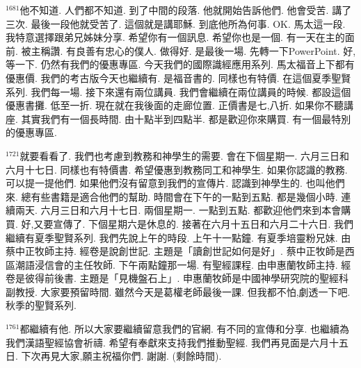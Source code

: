 \documentclass{book}
\begin{document}
$^{1681}$他不知道.
人們都不知道.
到了中間的段落.
他就開始告訴他們.
他會受苦.
講了三次.
最後一段他就受苦了.
這個就是講耶穌.
到底他所為何事.
OK.
馬太這一段.
我特意選擇跟弟兄姊妹分享.
希望你有一個訊息.
希望你也是一個.
有一天在主的面前.
被主稱讚.
有良善有忠心的僕人.
做得好.
是最後一場.
先轉一下PowerPoint.
好,等一下.
仍然有我們的優惠專區.
今天我們的國際識經應用系列.
馬太福音上下都有優惠價.
我們的考古版今天也繼續有.
是福音書的.
同樣也有特價.
在這個夏季聖賢系列.
我們每一場.
接下來還有兩位講員.
我們會繼續在兩位講員的時候.
都設這個優惠書攤.
低至一折.
現在就在我後面的走廊位置.
正價書是七,八折.
如果你不聽講座.
其實我們有一個長時間.
由十點半到四點半.
都是歡迎你來購買.
有一個最特別的優惠專區.

$^{1721}$就要看看了.
我們也考慮到教務和神學生的需要.
會在下個星期一.
六月三日和六月十七日.
同樣也有特價書.
希望優惠到教務同工和神學生.
如果你認識的教務.
可以提一提他們.
如果他們沒有留意到我們的宣傳片.
認識到神學生的.
也叫他們來.
總有些書籍是適合他們的幫助.
時間會在下午的一點到五點.
都是幾個小時.
連續兩天.
六月三日和六月十七日.
兩個星期一.
一點到五點.
都歡迎他們來到本會購買.
好,又要宣傳了.
下個星期六是休息的.
接著在六月十五日和六月二十六日.
我們繼續有夏季聖賢系列.
我們先說上午的時段.
上午十一點鐘.
有夏季培靈粉兄妹.
由蔡中正牧師主持.
經卷是說創世記.
主題是「讀創世記如何是好」.
蔡中正牧師是西區潮語浸信會的主任牧師.
下午兩點鐘那一場.
有聖經課程.
由申惠蘭牧師主持.
經卷是彼得前後書.
主題是「見機盤石上」.
申惠蘭牧師是中國神學研究院的聖經科副教授.
大家要預留時間.
雖然今天是葛權老師最後一課.
但我都不怕,劇透一下吧.
秋季的聖賢系列.

$^{1761}$都繼續有他.
所以大家要繼續留意我們的官網.
有不同的宣傳和分享.
也繼續為我們漢語聖經協會祈禱.
希望有奉獻來支持我們推動聖經.
我們再見面是六月十五日.
下次再見大家,願主祝福你們.
謝謝.
(剩餘時間).
\newpage
\end{document}
